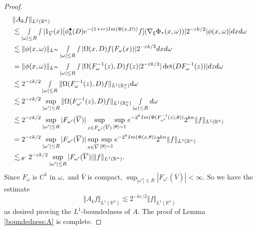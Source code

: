 \documentclass[12pt, reqno]{amsart}
\theoremstyle{definition}
\theoremstyle{remark}
\numberwithin{equation}{section}
\begin{document}
\begin{proof}
\begin{align*}
    &\Vert A_k f\Vert_{L^1(\mathbb{R}^n)}  \\
    &\lesssim\smallint_{|\omega|\leq R}\smallint |1_{\overline{V}}(x)[\phi_{k}^\bullet(D)e^{-(1+i\tau)\textnormal{Im}(\Phi(x,D))}f](\nabla_\xi\Phi_\tau(x,\omega))|2^{-\varepsilon k/2}|\phi(x,\omega)|dx d\omega\\
    &\lesssim \Vert\phi(x,\omega)\Vert_{L^{\infty}} \smallint_{|\omega|\leq R}\smallint |\Omega(x,D)f(F_{\omega}(x))|2^{-\varepsilon k/2}dx d\omega\\
    &= \Vert\phi(x,\omega)\Vert_{L^{\infty}} \smallint_{|\omega|\leq R}\smallint |\Omega(F^{-1}_\omega(z),D)f(z)|2^{-\varepsilon k/2}|\det(DF_{\omega}^{-1}(z))|dz d\omega\\
    &\lesssim 2^{-\varepsilon k/2} \smallint_{|\omega|\leq R}\Vert\Omega(F^{-1}_\omega(z),D)f\Vert_{L^1(\mathbb{R}^n_z)}d\omega\\
    &\lesssim 2^{-\varepsilon k/2} \sup_{|\omega'|\leq R}\Vert\Omega(F^{-1}_{\omega'}(z),D)f\Vert_{L^1(\mathbb{R}^n_z)} \smallint_{|\omega|\leq R}d\omega\\
    & \lesssim 2^{-\varepsilon k/2} \sup_{|\omega'|\leq R} |F_{\omega'}(\overline{V})|\sup_{z\in F_{\omega'}(\overline{V})} \sup_{|\theta|\sim 1}e^{-2^{k}\textnormal{Im}(\Phi(F_{\omega'}^{-1}(z),\theta))}2^{kn}\Vert f\Vert_{L^1(\mathbb{R}^n)}\\
    &=2^{-\varepsilon k/2} \sup_{|\omega'|\leq R} |F_{\omega'}(\overline{V})|\sup_{x\in \overline{V}} \sup_{|\theta|\sim 1}e^{-2^{k}\textnormal{Im}(\Phi(x,\theta))}2^{kn}\Vert f\Vert_{L^1(\mathbb{R}^n)}\\
    &\lesssim_{\mathscr{K}} 2^{-\varepsilon k/2} \sup_{|\omega'|\leq R} |F_{\omega'}(\overline{V})|\Vert f\Vert_{L^1(\mathbb{R}^n)}.
\end{align*} Since $F_{\omega}$ is $C^1$ in $\omega,$ and $\overline{V}$ is compact, $ \sup_{|\omega'|\leq R} |F_{\omega'}(\overline{V})|<\infty.$ So we have the estimate
\begin{equation}
    \Vert A_k f\Vert_{L^1(\mathbb{R}^n)}\lesssim 2^{-k\varepsilon/2}\Vert f\Vert_{L^1(\mathbb{R}^n)}
\end{equation}as desired proving the $L^1$-boundedness of $A.$ The proof of Lemma \ref{boundedness:A} is complete.
\end{proof} 
\end{document}
